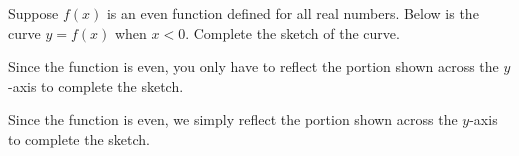 \begin{question}
Suppose $f(x)$ is an even function defined for all real numbers. Below is the curve $y=f(x)$ when $x<0$. Complete the sketch of the curve.
\begin{center}\end{center}
\end{question}
\begin{hint}
Since the function is even, you only have to reflect the portion shown across the $y$-axis to complete the sketch.
\end{hint}
\begin{answer}
\begin{center}\end{center}
\end{answer}
\begin{solution}
Since the function is even, we simply reflect the portion shown across the $y$-axis to complete the sketch.
\begin{center}\end{center}
\end{solution}


